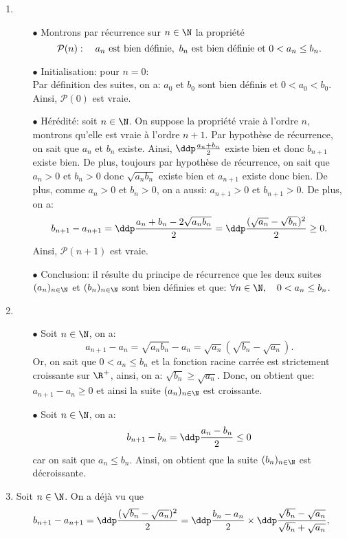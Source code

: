 \begin{correction}
\begin{enumerate}
 \item 
\begin{itemize}
 \item[$\bullet$] Montrons par r\'ecurrence sur $n\in\N$ la propri\'et\'e
$$\mathcal{P}(n):\quad a_n\ \hbox{est bien d\'efinie},\ b_n\ \hbox{est bien d\'efinie}\ \hbox{et}\ 0<a_n\leq b_n.$$ 
\item[$\bullet$] Initialisation: pour $n=0$:\\
Par d\'efinition des suites, on a: $a_0$ et $b_0$ sont bien d\'efinis et $0<a_0<b_0$. Ainsi, $\mathcal{P}(0)$ est vraie.
\item[$\bullet$]  H\'er\'edit\'e: soit $n\in\N$. On suppose la propri\'et\'e vraie \`a l'ordre $n$, montrons qu'elle est vraie \`a l'ordre $n+1$. Par hypoth\`ese de r\'ecurrence, on sait que $a_n$ et $b_n$ existe. Ainsi, $\ddp\frac{a_n+b_n}{2}$ existe bien et donc $b_{n+1}$ existe bien. De plus, toujours par hypoth\`ese de r\'ecurrence, on sait que $a_n>0$ et $b_n>0$ donc $\sqrt{a_nb_n}$ existe bien et $a_{n+1}$ existe donc bien. De plus, comme $a_n>0$ et $b_n>0$, on a aussi: $a_{n+1}>0$ et $b_{n+1}>0$. 
De plus, on a:
$$b_{n+1}-a_{n+1}=\ddp\frac{a_n+b_n-2\sqrt{a_nb_n}}{2}=\ddp\frac{(\sqrt{a_n}-\sqrt{b_n})^2}{2}\geq 0.$$
Ainsi, $\mathcal{P}(n+1)$ est vraie.
\item[$\bullet$] Conclusion: il r\'esulte du principe de r\'ecurrence que les deux suites $(a_n)_{n\in\N}$ et $(b_n)_{n\in\N}$ sont bien d\'efinies et que: $\forall n\in\N,\quad 0<a_n\leq b_n$.
\end{itemize}
\item 
\begin{itemize}
 \item[$\bullet$] Soit $n\in\N$, on a: 
$$a_{n+1}-a_n=\sqrt{a_nb_n}-a_n=\sqrt{a_n}\left(\sqrt{b_n}-\sqrt{a_n}  \right).$$
Or, on sait que $0<a_n\leq b_n$ et la fonction racine carr\'ee est strictement croissante sur $\R^+$, ainsi, on a: $\sqrt{b_n}\geq \sqrt{a_n}$. Donc, on obtient que: $a_{n+1}-a_n\geq 0$ et ainsi la suite $(a_n)_{n\in\N}$ est croissante.
\item[$\bullet$]  Soit $n\in\N$, on a:
$$b_{n+1}-b_n=\ddp\frac{a_n-b_n}{2}\leq 0$$
car on sait que $a_n\leq b_n$. Ainsi, on obtient que la suite $(b_n)_{n\in\N}$ est d\'ecroissante.
\end{itemize}
\item Soit $n\in\N$. On a d\'ej\`a vu que
$$b_{n+1}-a_{n+1}=\ddp\frac{(\sqrt{b_n}-\sqrt{a_n})^2}{2}=\ddp\frac{b_n-a_n}{2}\times \ddp\frac{\sqrt{b_n}-\sqrt{a_n}}{\sqrt{b_n}+\sqrt{a_n}},$$

\end{enumerate}
\end{correction}

